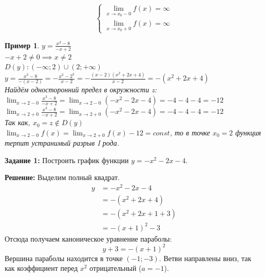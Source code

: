 \documentclass[12pt, a4paper]{article}
\newtheorem{example}{Пример}[subsection]
\theoremstyle{remark}
\begin{document}
	\vspace{0.5cm}
	
	\[
	\begin{cases}
		\lim\limits_{x \to x_0-0} f(x) = \infty \\[10pt]
		\lim\limits_{x \to x_0+0} f(x) = \infty
	\end{cases}
	\]
	
	\newpage
	
	\begin{example}
		$y = \frac{x^3 - 8}{-x + 2}$ \\
		
		$-x + 2 \neq 0 \implies x \neq 2$ \\
		
		$D(y): (-\infty; 2) \cup (2; +\infty)$ \\
		
		$y = \frac{x^3 - 8}{-(x - 2)} = -\frac{x^3 - 2^3}{x - 2} = -\frac{(x - 2)(x^2 + 2x + 4)}{x - 2} = -(x^2 + 2x + 4)$ \\
		
		Найдём односторонний предел в окружности z: \\
		
		$\lim_{x \to 2 - 0} \frac{x^3 - 8}{-x + 2} = \lim_{x \to 2 - 0} (-x^2 - 2x - 4) = -4 - 4 - 4 = -12$ \\
		
		$\lim_{x \to 2 + 0} \frac{x^3 - 8}{-x + 2} = \lim_{x \to 2 + 0} (-x^2 - 2x - 4) = -4 - 4 - 4 = -12$ \\
		
		Так как, $x_0 = z \notin D(y)$ \\
		
		$\lim_{x \to 2 - 0} f(x) = \lim_{x \to 2 + 0} f(x) -12 = const$, то в точке $x_0 = 2$ функция терпит устранимый разрыв I рода.\\
	\end{example}
	
	\newpage
	
	\noindent \textbf{Задание 1:} Построить график функции \(y = -x^2 - 2x - 4\).
	
	\vspace{0.3cm}
	\noindent \textbf{Решение:} Выделим полный квадрат.
	\begin{align*}
		y &= -x^2 - 2x - 4 \\
		&= -(x^2 + 2x + 4) \\
		&= -(x^2 + 2x + 1 + 3) \\
		&= -(x+1)^2 - 3
	\end{align*}
	Отсюда получаем каноническое уравнение параболы:
	\[
	y + 3 = -(x+1)^2
	\]
	Вершина параболы находится в точке \((-1; -3)\). Ветви направлены вниз, так как коэффициент перед \(x^2\) отрицательный (\(a = -1\)).
	
\end{document}
